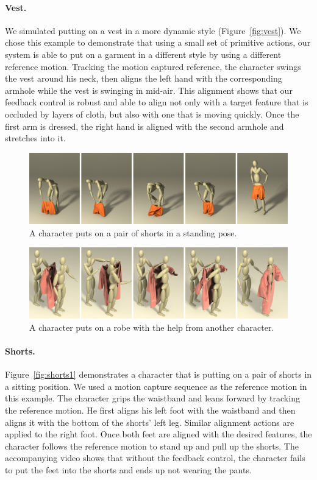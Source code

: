 \paragraph{Vest.} We simulated putting on a vest in a more dynamic style (Figure~\ref{fig:vest}). We chose this example to demonstrate that using a small set of primitive actions, our system is able to put on a garment in a different style by using a different reference motion. Tracking the motion captured reference, the character swings the vest around his neck, then aligns the left hand with the corresponding armhole while the vest is swinging in mid-air. This alignment shows that our feedback control is robust and able to align not only with a target feature that is occluded by layers of cloth, but also with one that is moving quickly. Once the first arm is dressed, the right hand is aligned with the second armhole and stretches into it. 

\begin{figure}[!t]
  \centering
  \includegraphics[width=\textwidth]{images/shortsStanding}
  \caption{A character puts on a pair of shorts in a standing pose.}
  \label{fig:shorts2}
\end{figure}

\begin{figure}[!t]
  \centering
  \includegraphics[width=\textwidth]{images/robe}
  \caption{A character puts on a robe with the help from another character.}
  \label{fig:robe}
\end{figure}

\paragraph{Shorts.} Figure~\ref{fig:shorts1} demonstrates a character that
is putting on a pair of shorts in a sitting position. We used a motion
capture sequence as the reference motion in this example. The character
grips the waistband and leans forward by tracking the reference motion. He
first aligns his left foot with the waistband and then aligns it with the
bottom of the shorts' left leg. Similar alignment actions are applied to
the right foot. Once both feet are aligned with the desired features, the
character follows the reference motion to stand up and pull up the shorts.
The accompanying video shows that without the feedback control, the
character fails to put the feet into the shorts and ends up not wearing
the pants.

